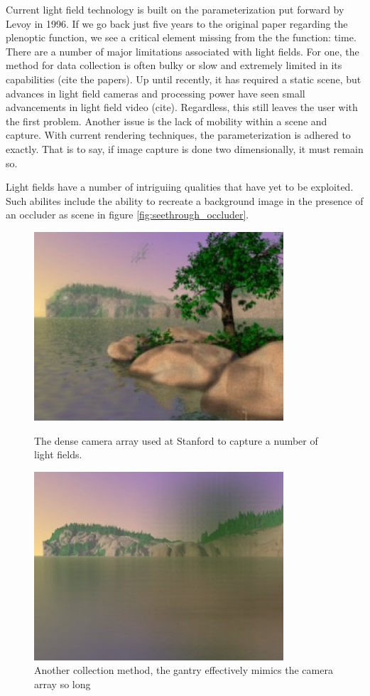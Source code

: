 \documentclass[12pt]{report}
\begin{document}
Current light field technology is built on the parameterization put forward by Levoy in 1996. If we go back just five years to the original paper regarding the plenoptic function, we see a critical element missing from the the function: time. There are a number of major limitations associated with light fields. For one, the method for data collection is often bulky or slow and extremely limited in its capabilities (cite the papers). Up until recently, it has required a static scene, but advances in light field cameras and processing power have seen small advancements in light field video (cite). Regardless, this still leaves the user with the first problem. Another issue is the lack of mobility within a scene and capture. With current rendering techniques, the parameterization is adhered to exactly. That is to say, if image capture is done two dimensionally, it must remain so. 

Light fields have a number of intriguiing qualities that have yet to be exploited. Such abilites include the ability to recreate a background image in the presence of an occluder as scene in figure \ref{fig:seethrough_occluder}. 
\begin{figure}[!ht]
	\centering
	\begin{minipage}{0.45\textwidth}
		\centering
		\includegraphics[scale=0.55]{seethrough_occluder.png}
		\caption{The dense camera array used at Stanford to capture a number of light fields.}
		\label{fig:seethrough_occluder}
	\end{minipage}\hfill
	\begin{minipage}{0.45\textwidth}
		\centering
		\includegraphics[scale=0.55]{seethrough_occluder2.png}
		\caption{Another collection method, the gantry effectively mimics the camera array so long}
		\label{fig:seethrough_occluder2}
	\end{minipage}
\end{figure}
\end{document}
